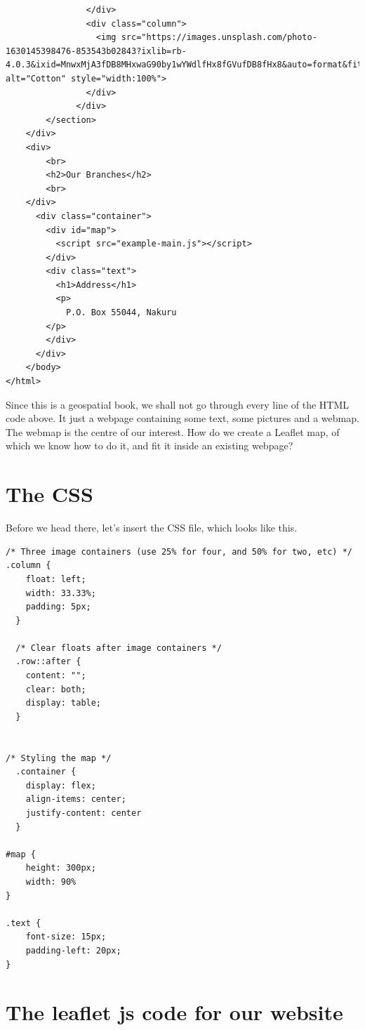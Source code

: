 \documentclass[
]{book}
\theoremstyle{definition}
\theoremstyle{definition}
\theoremstyle{definition}
\theoremstyle{definition}
\theoremstyle{remark}
\begin{document}
\begin{verbatim}
                </div>
                <div class="column">
                  <img src="https://images.unsplash.com/photo-1630145398476-853543b02843?ixlib=rb-4.0.3&ixid=MnwxMjA3fDB8MHxwaG90by1wYWdlfHx8fGVufDB8fHx8&auto=format&fit=crop&w=1167&q=80" alt="Cotton" style="width:100%">
                </div>
              </div>
        </section>
    </div>
    <div>
        <br>
        <h2>Our Branches</h2>
        <br>
    </div>
      <div class="container">
        <div id="map">
          <script src="example-main.js"></script>
        </div>
        <div class="text">
          <h1>Address</h1>
          <p>
            P.O. Box 55044, Nakuru
        </p>
        </div>
      </div>
    </body>
</html>
\end{verbatim}

Since this is a geospatial book, we shall not go through every line of the HTML code above. It just a webpage containing some text, some pictures and a webmap. The webmap is the centre of our interest. How do we create a Leaflet map, of which we know how to do it, and fit it inside an existing webpage?

\hypertarget{the-css}{%
\section{The CSS}\label{the-css}}

Before we head there, let's insert the CSS file, which looks like this.

\begin{verbatim}
/* Three image containers (use 25% for four, and 50% for two, etc) */
.column {
    float: left;
    width: 33.33%;
    padding: 5px;
  }
  
  /* Clear floats after image containers */
  .row::after {
    content: "";
    clear: both;
    display: table;
  }


/* Styling the map */
  .container {
    display: flex;
    align-items: center;
    justify-content: center
  }

#map {
    height: 300px; 
    width: 90%
}

.text {
    font-size: 15px;
    padding-left: 20px;
}
\end{verbatim}

\hypertarget{the-leaflet-js-code-for-our-website}{%
\section{The leaflet js code for our website}\label{the-leaflet-js-code-for-our-website}}
\end{document}
